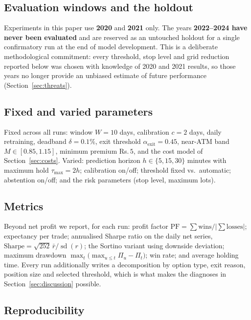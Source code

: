 \documentclass[11pt,a4paper]{article}
\newcommand{\rs}{Rs.\,}                 %
\begin{document}
\subsection{Evaluation windows and the holdout}

Experiments in this paper use \textbf{2020} and \textbf{2021} only. The years
\textbf{2022--2024 have never been evaluated} and are reserved as an untouched holdout
for a single confirmatory run at the end of model development. This is a deliberate
methodological commitment: every threshold, stop level and grid reduction reported below
was chosen with knowledge of 2020 and 2021 results, so those years no longer provide an
unbiased estimate of future performance (Section~\ref{sec:threats}).

\subsection{Fixed and varied parameters}

Fixed across all runs: window $W=10$ days, calibration $c=2$ days, daily retraining,
deadband $\delta=0.1\%$, exit threshold $\alpha_{\text{exit}}=0.45$, near-ATM band
$M\in[0.85,1.15]$, minimum premium \rs$5$, and the cost model of
Section~\ref{sec:costs}. Varied: prediction horizon $h \in \{5,15,30\}$ minutes with
maximum hold $\tau_{\max}=2h$; calibration on/off; threshold fixed vs.\ automatic;
abstention on/off; and the risk parameters (stop level, maximum lots).

\subsection{Metrics}

Beyond net profit we report, for each run: profit factor
$\text{PF} = \sum \text{wins} / |\sum \text{losses}|$; expectancy per trade;
annualised Sharpe ratio on the daily net series,
$\text{Sharpe} = \sqrt{252}\,\bar{r}/\operatorname{sd}(r)$; the Sortino variant using
downside deviation; maximum drawdown $\max_t\big(\max_{u\le t}\Pi_u - \Pi_t\big)$; win
rate; and average holding time. Every run additionally writes a decomposition by option
type, exit reason, position size and selected threshold, which is what makes the
diagnoses in Section~\ref{sec:discussion} possible.

\subsection{Reproducibility}
\end{document}
